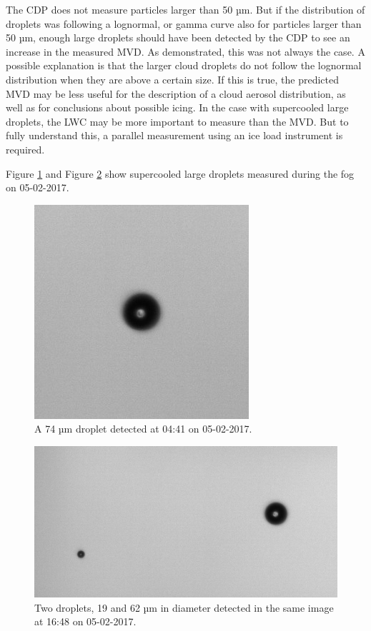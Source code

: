 The CDP does not measure particles larger than 50 µm. But if the distribution of droplets was following a lognormal, or gamma curve \cite{miles2000,lee2010} also for particles larger than 50 µm, enough large droplets should have been detected by the CDP to see an increase in the measured MVD. As demonstrated, this was not always the case. A possible explanation is that the larger cloud droplets do not follow the lognormal distribution when they are above a certain size. If this is true, the predicted MVD may be less useful for the description of a cloud aerosol distribution, as well as for conclusions about possible icing. In the case with supercooled large droplets, the LWC may be more important to measure than the MVD. But to fully understand this, a parallel measurement using an ice load instrument is required.

Figure \ref{fig:170505_0441_droplet} and Figure \ref{fig:170505_1648_droplet} show supercooled large droplets measured during the fog on 05-02-2017.

\begin{figure}[ht]
  \centering
  \includegraphics[width=0.4\linewidth]{figures/170205_0441_droplet_74um}
\caption{A 74 µm droplet detected at 04:41 on 05-02-2017.}
\label{fig:170505_0441_droplet}
\end{figure}
\begin{figure}[ht]
  \centering
  \includegraphics[width=0.8\linewidth]{figures/170205_1648_droplet_19and62um}
\caption{Two droplets, 19 and 62 µm in diameter detected in the same image at 16:48 on 05-02-2017.}
\label{fig:170505_1648_droplet}
\end{figure}


